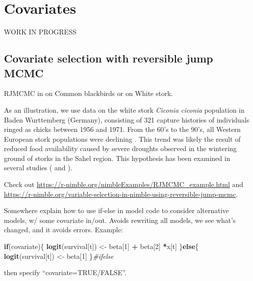 \documentclass[
  12pt,
]{krantz}
\newenvironment{Shaded}{\begin{snugshade}}{\end{snugshade}}
\newcommand{\CommentTok}[1]{\textcolor[rgb]{0.56,0.35,0.01}{\textit{#1}}}
\newcommand{\ControlFlowTok}[1]{\textcolor[rgb]{0.13,0.29,0.53}{\textbf{#1}}}
\newcommand{\DecValTok}[1]{\textcolor[rgb]{0.00,0.00,0.81}{#1}}
\newcommand{\FunctionTok}[1]{\textcolor[rgb]{0.13,0.29,0.53}{\textbf{#1}}}
\newcommand{\NormalTok}[1]{#1}
\newcommand{\OtherTok}[1]{\textcolor[rgb]{0.56,0.35,0.01}{#1}}
\newcommand{\SpecialCharTok}[1]{\textcolor[rgb]{0.81,0.36,0.00}{\textbf{#1}}}
\begin{document}
\chapter{Covariates}\label{covariateschapter}

WORK IN PROGRESS

\section{Covariate selection with reversible jump MCMC}\label{covariate-selection-with-reversible-jump-mcmc}

RJMCMC in \citet{gimenez2009fitness} on Common blackbirds or \citet{gimenez2009winbugs} on White stork.

As an illustration, we use data on the white stork \emph{Ciconia ciconia} population in Baden Wurttemberg (Germany), consisting of 321 capture histories of individuals ringed as chicks between 1956 and 1971. From the 60's to the 90's, all Western European stork populations were declining \citet{bair91}. This trend was likely the result of reduced food availability \citet{schau05} caused by severe droughts observed in the wintering ground of storks in the Sahel region. This hypothesis has been examined in several studies (\citet{kanya90} and \citet{barb99}).

Check out \url{https://r-nimble.org/nimbleExamples/RJMCMC_example.html} and \url{https://r-nimble.org/variable-selection-in-nimble-using-reversible-jump-mcmc}.

Somewhere explain how to use if-else in model code to consider alternative models, w/ some covariate in/out. Avoids rewriting all models, we see what's changed, and it avoids errors. Example:

\begin{Shaded}
\begin{Highlighting}[]
\ControlFlowTok{if}\NormalTok{(covariate)\{}
\FunctionTok{logit}\NormalTok{(survival[t]) }\OtherTok{\textless{}{-}}\NormalTok{ beta[}\DecValTok{1}\NormalTok{] }\SpecialCharTok{+}\NormalTok{ beta[}\DecValTok{2}\NormalTok{] }\SpecialCharTok{*}\NormalTok{x[t]}
\NormalTok{\}}\ControlFlowTok{else}\NormalTok{\{}
\FunctionTok{logit}\NormalTok{(survival[t]) }\OtherTok{\textless{}{-}}\NormalTok{ beta[}\DecValTok{1}\NormalTok{]}
\NormalTok{\}}\CommentTok{\#ifelse}
\end{Highlighting}
\end{Shaded}

then specify ``covariate=TRUE/FALSE''.
\end{document}
